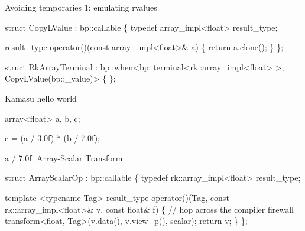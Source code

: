 
\begin{frame}[fragile]{Avoiding temporaries 1: emulating rvalues}
\begin{semiverbatim}
struct \alert<2>{CopyLValue} : bp::callable
\{
  typedef array_impl<float> result_type;

  result_type
  operator()(const array_impl<float>& a)
  \{
    return a.clone();
  \}
\};


struct RkArrayTerminal 
  : bp::when<bp::terminal<rk::array_impl<float> >, 
             CopyLValue(bp::_value)>
\{ \};


\end{semiverbatim}
\note{

}
\end{frame}


\begin{frame}[fragile]{Kamasu hello world}
\begin{semiverbatim}

array<float> a, b, c;

\alert<2>{c = (a / 3.0f) * (b / 7.0f);}

\end{semiverbatim}
\note{

}
\end{frame}

\begin{frame}[fragile]{a / 7.0f:  Array-Scalar Transform}
\begin{semiverbatim}

struct ArrayScalarOp : bp::callable
\{
  typedef rk::array_impl<float> result_type;

  template <typename Tag>
  result_type 
  operator()(Tag, const rk::array_impl<float>& v, 
             const float& f)
  \{
    // hop across the compiler firewall
    transform<float, Tag>(v.data(), v.view_p(), scalar);
    return v;
  \}
\};


\end{semiverbatim}
\end{frame}


